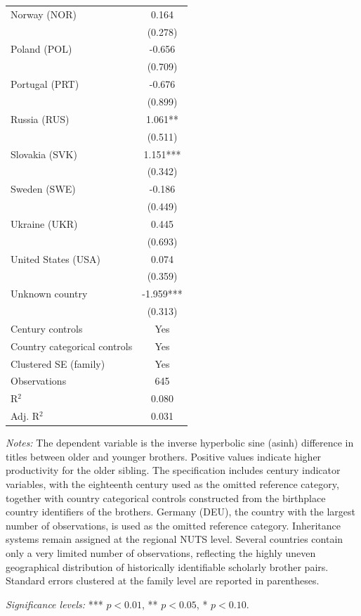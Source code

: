 \begin{center}
\begin{longtable}{l c}
Norway (NOR)
& 0.164 \\
& (0.278) \\

Poland (POL)
& -0.656 \\
& (0.709) \\

Portugal (PRT)
& -0.676 \\
& (0.899) \\

Russia (RUS)
& 1.061** \\
& (0.511) \\

Slovakia (SVK)
& 1.151*** \\
& (0.342) \\

Sweden (SWE)
& -0.186 \\
& (0.449) \\

Ukraine (UKR)
& 0.445 \\
& (0.693) \\

United States (USA)
& 0.074 \\
& (0.359) \\

Unknown country
& -1.959*** \\
& (0.313) \\

\midrule
Century controls & Yes \\
Country categorical controls & Yes \\
Clustered SE (family) & Yes \\
\midrule
Observations & 645 \\
R$^{2}$ & 0.080 \\
Adj. R$^{2}$ & 0.031 \\

\end{longtable}

\vspace{4pt}

\begin{minipage}{0.95\textwidth}
\footnotesize
\textit{Notes:} The dependent variable is the inverse hyperbolic sine (asinh) difference in titles between older and younger brothers. Positive values indicate higher productivity for the older sibling. The specification includes century indicator variables, with the eighteenth century used as the omitted reference category, together with country categorical controls constructed from the birthplace country identifiers of the brothers. Germany (DEU), the country with the largest number of observations, is used as the omitted reference category. Inheritance systems remain assigned at the regional NUTS level. Several countries contain only a very limited number of observations, reflecting the highly uneven geographical distribution of historically identifiable scholarly brother pairs. Standard errors clustered at the family level are reported in parentheses.

\textit{Significance levels:} *** $p<0.01$, ** $p<0.05$, * $p<0.10$.
\end{minipage}

\end{center}